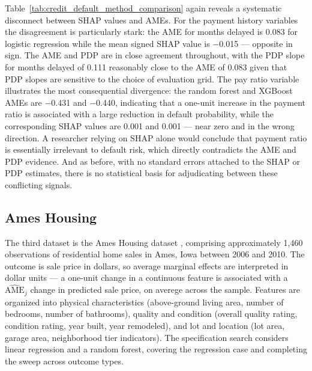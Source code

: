 \documentclass[12pt]{article}
\begin{document}
	Table~\ref{tab:credit_default_method_comparison} again reveals a systematic disconnect between SHAP values and AMEs. For the payment history variables the disagreement is particularly stark: the AME for months delayed is 0.083 for logistic regression while the mean signed SHAP value is $-$0.015 --- opposite in sign. The AME and PDP are in close agreement throughout, with the PDP slope for months delayed of 0.111 reasonably close to the AME of 0.083 given that PDP slopes are sensitive to the choice of evaluation grid. The pay ratio variable illustrates the most consequential divergence: the random forest and XGBoost AMEs are $-$0.431 and $-$0.440, indicating that a one-unit increase in the payment ratio is associated with a large reduction in default probability, while the corresponding SHAP values are 0.001 and 0.001 --- near zero and in the wrong direction. A researcher relying on SHAP alone would conclude that payment ratio is essentially irrelevant to default risk, which directly contradicts the AME and PDP evidence. And as before, with no standard errors attached to the SHAP or PDP estimates, there is no statistical basis for adjudicating between these conflicting signals.
	
	\subsection{Ames Housing}
	
	The third dataset is the Ames Housing dataset \citep{decock2011}, comprising approximately 1,460 observations of residential home sales in Ames, Iowa between 2006 and 2010. The outcome is sale price in dollars, so average marginal effects are interpreted in dollar units --- a one-unit change in a continuous feature is associated with a $\widehat{\mathrm{AME}}_j$ change in predicted sale price, on averege across the sample. Features are organized into physical characteristics (above-ground living area, number of bedrooms, number of bathrooms), quality and condition (overall quality rating, condition rating, year built, year remodeled), and lot and location (lot area, garage area, neighborhood tier indicators). The specification search considers linear regression and a random forest, covering the regression case and completing the sweep across outcome types.
	
\end{document}
